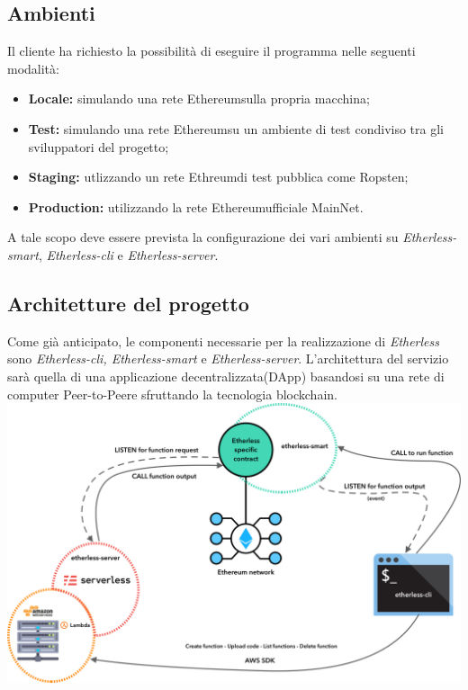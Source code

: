 \subsection{Ambienti}
Il cliente ha richiesto la possibilità di eseguire il programma nelle seguenti modalità:
\begin{itemize}
	\item \textbf{Locale:} simulando una rete Ethereum\glo sulla propria macchina;
	\item \textbf{Test:} simulando una rete Ethereum\glo su un ambiente di test condiviso tra gli sviluppatori del progetto;
	\item \textbf{Staging:} utlizzando un rete Ethreum\glo di test pubblica come Ropsten\glos;
	\item \textbf{Production:} utilizzando la rete Ethereum\glo ufficiale MainNet\glos.
\end{itemize}
A tale scopo deve essere prevista la configurazione dei vari ambienti su \textit{Etherless-smart}, \textit{Etherless-cli} e \textit{Etherless-server}.
\subsection{Architetture del progetto}
Come già anticipato, le componenti necessarie per la realizzazione di \textit{Etherless} sono \textit{Etherless-cli, Etherless-smart} e \textit{Etherless-server}. L'architettura del servizio sarà quella di una applicazione decentralizzata\glo (DApp\glo) basandosi su una rete di computer Peer-to-Peer\glo e sfruttando la tecnologia blockchain\glo.\\
\includegraphics[width=\textwidth]{res/img/archi}
